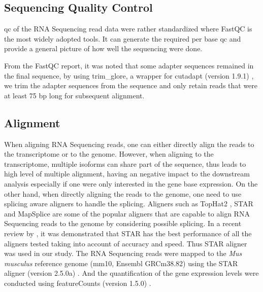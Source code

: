 \subsection{Sequencing Quality Control}
\Gls{qc} of the RNA Sequencing read data were rather standardized where FastQC \citep{Andrews2010} is the most widely adopted tools.
It can generate the required per base \gls{qc} and provide a general picture of how well the sequencing were done.

From the FastQC report, it was noted that some adapter sequences remained in the final sequence, by using trim\_glore, a wrapper for cutadapt (version 1.9.1) \citep{Martin2011}, we trim the adapter sequences from the sequence and only retain reads that were at least 75 \gls{bp} long for subsequent alignment. 
\subsection{Alignment}

When aligning RNA Sequencing reads, one can either directly align the reads to the transcriptome or to the genome. 
However, when aligning to the transcriptome, multiple isoforms can share part of the sequence, thus leads to high level of multiple alignment, having an negative impact to the downstream analysis especially if one were only interested in the gene base expression.
On the other hand, when directly aligning the reads to the genome, one need to use splicing aware aligners to handle the splicing.
Aligners such as TopHat2 \citep{Kim2013}, STAR \citep{Dobin2013} and MapSplice \citep{Wang2010} are some of the popular aligners that are capable to align RNA Sequencing reads to the genome by considering possible splicing.
In a recent review by \citet{Engstrom2013}, it was demonstrated that STAR has the best performance of all the aligners tested taking into account of accuracy and speed.
Thus STAR aligner was used in our study.
The RNA Sequencing reads were mapped to the \textit{Mus musculus} reference genome (mm10, Ensembl GRCm38.82) using the STAR aligner (version 2.5.0a) \citep{Dobin2013}.
And the quantification of the gene expression levels were conducted using featureCounts (version 1.5.0) \citep{Liao2014}.

